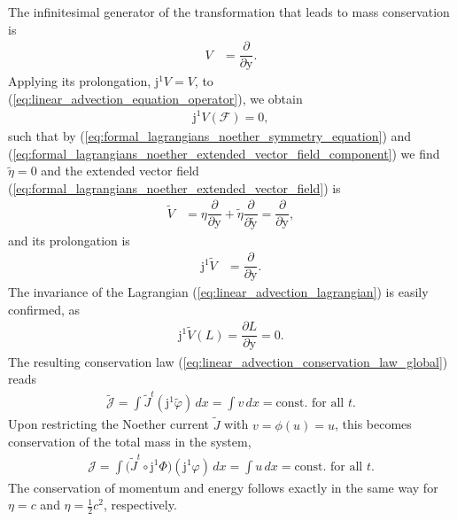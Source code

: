 \documentclass[12pt,a4paper,reqno]{article}
\begin{document}
The infinitesimal generator of the transformation that leads to mass conservation is
\begin{align}\label{eq:linear_advection_generator_U_L1}
V &= \dfrac{\partial}{\partial {\ensuremath{{\ensuremath{\mathrm{{y}}}}}}} .
\end{align}
Applying its prolongation, ${\ensuremath{\mathrm{j}}}^{1} V = V$, to (\ref{eq:linear_advection_equation_operator}), we obtain
\begin{align}
{\ensuremath{\mathrm{j}}}^{1} V (\mathcal{F}) = 0 ,
\end{align}
such that by (\ref{eq:formal_lagrangians_noether_symmetry_equation}) and (\ref{eq:formal_lagrangians_noether_extended_vector_field_component}) we find $\tilde{\eta} = 0$ and the extended vector field (\ref{eq:formal_lagrangians_noether_extended_vector_field}) is
\begin{align}\label{eq:linear_advection_generator_L1}
\tilde{V} &= \eta \dfrac{\partial}{\partial {\ensuremath{{\ensuremath{\mathrm{{y}}}}}}} + \tilde{\eta} \dfrac{\partial}{\partial \tilde{\ensuremath{{\ensuremath{\mathrm{{y}}}}}}} = \dfrac{\partial}{\partial {\ensuremath{{\ensuremath{\mathrm{{y}}}}}}} ,
\end{align}
and its prolongation is
\begin{align}
{\ensuremath{\mathrm{j}}}^{1} \tilde{V} &= \dfrac{\partial}{\partial {\ensuremath{{\ensuremath{\mathrm{{y}}}}}}} .
\end{align}
The invariance of the Lagrangian (\ref{eq:linear_advection_lagrangian}) is easily confirmed, as
\begin{align}
{\ensuremath{\mathrm{j}}}^{1} \tilde{V} (L) = \dfrac{\partial L}{\partial {\ensuremath{{\ensuremath{\mathrm{{y}}}}}}} = 0 .
\end{align}
The resulting conservation law (\ref{eq:linear_advection_conservation_law_global}) reads
\begin{align}
\tilde{\mathcal{J}}
= \int \tilde{J}^{t} ({\ensuremath{\mathrm{j}}}^{1} \tilde{\ensuremath{\varphi}}) \, d{\ensuremath{{\ensuremath{{x}}}}}
= \int {\ensuremath{{\ensuremath{{v}}}}} \, d{\ensuremath{{\ensuremath{{x}}}}} 
= \text{const. for all ${\ensuremath{{\ensuremath{{t}}}}}$} .
\end{align}
Upon restricting the Noether current $\tilde{J}$ with ${\ensuremath{{\ensuremath{{v}}}}} = \phi ({\ensuremath{{\ensuremath{{u}}}}}) = {\ensuremath{{\ensuremath{{u}}}}}$, this becomes conservation of the total mass in the system,
\begin{align}
\mathcal{J}
= \int \big( \tilde{J}^{t} \circ {\ensuremath{\mathrm{j}}}^{1} \Phi \big) ({\ensuremath{\mathrm{j}}}^{1} {\ensuremath{\varphi}}) \, d{\ensuremath{{\ensuremath{{x}}}}}
= \int {\ensuremath{{\ensuremath{{u}}}}} \, d{\ensuremath{{\ensuremath{{x}}}}}
= \text{const. for all ${\ensuremath{{\ensuremath{{t}}}}}$} .
\end{align}
The conservation of momentum and energy follows exactly in the same way for $\eta = c$ and $\eta = \tfrac{1}{2} c^{2}$, respectively.
\end{document}
